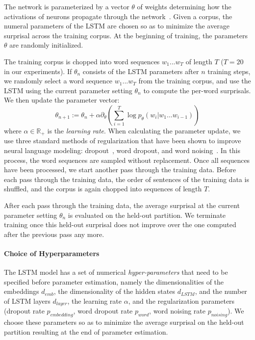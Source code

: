 \documentclass[11pt,letterpaper]{article}
\begin{document}
The network is parameterized by a vector $\theta$ of weights determining how the activations of neurons propagate through the network~\citep{hochreiter-long-1997}.
Given a corpus, the numeral parameters of the LSTM are chosen so as to minimize the average surprisal across the training corpus.
At the beginning of training, the parameters $\theta$ are randomly initialized.

The training corpus is chopped into word sequences $w_1 ... w_T$ of length $T$ ($T = 20$ in our experiments).
If $\theta_n$ consists of the LSTM parameters after $n$ training steps, we randomly select a word sequence $w_1 ... w_T$ from the training corpus, and use the LSTM using the current parameter setting $\theta_n$ to compute the per-word surprisals.
We then update the parameter vector:
\begin{equation}\label{eq:train}
	\theta_{n+1} := \theta_n + \alpha \partial_\theta \left(\sum_{i=1}^T \log p_\theta(w_i|w_1...w_{i-1})\right)
\end{equation}
where $\alpha \in \mathbb{R}_+$ is the \emph{learning rate}.
When calculating the parameter update, we use three standard methods of regularization that have been shown to improve neural language modeling: dropout~\citep{srivastava-dropout:-2014}, word dropout, and word noising~\citep{xie2017data}.
In this process, the word sequences are sampled without replacement.
Once all sequences have been processed, we start another pass through the training data.
Before each pass through the training data, the order of sentences of the training data is shuffled, and the corpus is again chopped into sequences of length $T$.

After each pass through the training data, the average surprisal at the current parameter setting $\theta_n$ is evaluated on the held-out partition.
We terminate training once this held-out  surprisal does not improve over the one computed after the previous pass any more.


\paragraph{Choice of Hyperparameters}

The LSTM model has a set of numerical \emph{hyper-parameters} that need to be specified before parameter estimation, namely the dimensionalities of the embeddings $d_{emb}$, the dimensionality of the hidden states $d_{LSTM}$, and the number of LSTM layers $d_{layer}$, the learning rate $\alpha$, and the regularization parameters (dropout rate $p_{embedding}$, word dropout rate $p_{word}$, word noising rate $p_{noising}$).
We choose these parameters so as to minimize the average surprisal on the held-out partition resulting at the end of parameter estimation.
\end{document}
